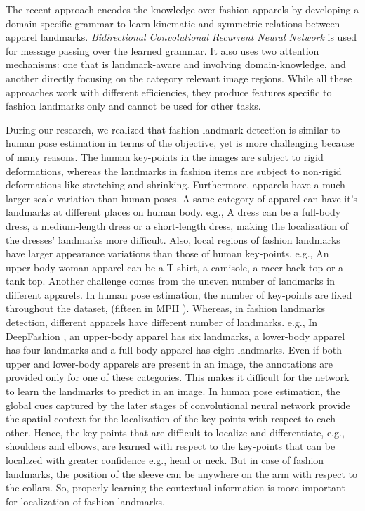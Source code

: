 \documentclass[conference]{IEEEtran}
\begin{document}
  The recent approach \cite{wang2018attentive} encodes the knowledge over fashion apparels by developing a domain specific grammar to learn kinematic and symmetric relations between apparel landmarks. \textit{Bidirectional Convolutional Recurrent Neural Network} is used for message passing over the learned grammar. It also uses two attention mechanisms: one that is landmark-aware and involving domain-knowledge, and another directly focusing on the category relevant image regions.  While all these approaches work with different efficiencies, they produce features specific to fashion landmarks only and cannot be used for other tasks.

 During our research, we realized that fashion landmark detection is similar to human pose estimation in terms of the objective, yet is more challenging because of many reasons. The human key-points in the images are subject to rigid deformations, whereas the landmarks in fashion items are subject to non-rigid deformations like stretching and shrinking. Furthermore, apparels have a much larger scale variation than human poses. A same category of apparel can have it's landmarks at different places on human body. e.g., A dress can be a full-body dress, a medium-length dress or a short-length dress, making the localization of the dresses' landmarks more difficult. Also, local regions of fashion landmarks have larger appearance variations than those of human key-points. e.g., An upper-body woman apparel can be a T-shirt, a camisole, a racer back top or a tank top. Another challenge comes from the uneven number of landmarks in different apparels. In human pose estimation, the number of key-points are fixed throughout the dataset, (fifteen in MPII \cite{andriluka14cvpr}). Whereas, in fashion landmarks detection, different apparels have different number of landmarks. e.g., In DeepFashion \cite{liu2016deepfashion}, an upper-body apparel has six landmarks, a lower-body apparel has four landmarks and a full-body apparel has eight landmarks. Even if both upper and lower-body apparels are present in an image, the annotations are provided only for one of these categories. This makes it difficult for the network to learn the landmarks to predict in an image.
 In human pose estimation, the global cues captured by the later stages of convolutional neural network provide the spatial context for the localization of the key-points with respect to each other. Hence, the key-points that are difficult to localize and differentiate, e.g., shoulders and elbows, are learned with respect to the key-points that can be localized with greater confidence e.g., head or neck. But in case of fashion landmarks, the position of the sleeve can be anywhere on the arm with respect to the collars. So, properly learning the contextual information is more important for localization of fashion landmarks.
\end{document}
